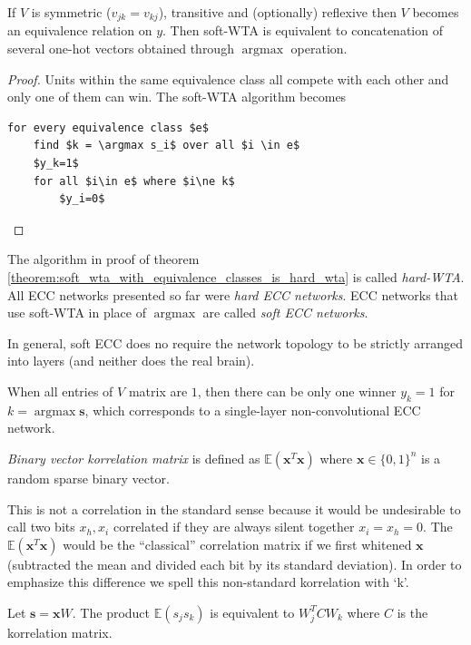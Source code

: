 \documentclass[oneside,english,logo]{amuthesis}
\DeclareMathOperator*{\argmax}{argmax}
\begin{document}
\begin{theorem}
	\label{theorem:soft_wta_with_equivalence_classes_is_hard_wta}
If $V$ is  symmetric ($v_{jk}=v_{kj}$), transitive and (optionally) reflexive then $V$ becomes an equivalence relation on $y$. Then soft-WTA is equivalent to concatenation of several one-hot vectors obtained through $\argmax$ operation.
\end{theorem}
\begin{proof}
	 Units within the same equivalence class all compete with each other and only one of them can win. The soft-WTA algorithm becomes
\begin{lstlisting}
for every equivalence class $e$
    find $k = \argmax s_i$ over all $i \in e$
    $y_k=1$ 
    for all $i\in e$ where $i\ne k$
        $y_i=0$ 
\end{lstlisting}
\end{proof}
\begin{definition}
The algorithm in proof of theorem \ref{theorem:soft_wta_with_equivalence_classes_is_hard_wta} is called \textit{hard-WTA}. All ECC networks presented so far were \textit{hard ECC networks}.
ECC networks that use soft-WTA in place of $\argmax$ are called \textit{soft ECC networks}.
\end{definition}
In general, soft ECC does no require the network topology to be strictly arranged into layers (and neither does the real brain).
\begin{corollary}
When all entries of $V$ matrix are $1$, then there can be only one winner $y_k=1$ for $k=\argmax \boldsymbol{s}$, which corresponds to a single-layer non-convolutional ECC network. 
\end{corollary}
\begin{definition}
\textit{Binary vector korrelation matrix} is defined as $\mathbb{E}(\boldsymbol{x}^T\boldsymbol{x})$ where $\boldsymbol{x}\in \{0,1\}^n$ is a random sparse binary vector.
\end{definition}
This is not a correlation in the standard sense because it would be undesirable to call two bits $x_h,x_i$ correlated  if they are always silent together $x_i=x_h=0$. The $\mathbb{E}(\boldsymbol{x}^T\boldsymbol{x})$ would be the ``classical'' correlation matrix if we first whitened $\boldsymbol{x}$ (subtracted the mean and divided each bit by its standard deviation). In order to emphasize this difference we spell this non-standard korrelation with `k'.
\begin{theorem}
	\label{subsection:s_j_s_k_is_cos_sim}
Let $\boldsymbol{s}=\boldsymbol{x} W$. The product $\mathbb{E}(s_j s_k)$ is equivalent to $W_j^T C W_k$ where $C$ is the korrelation matrix.
\end{theorem}
\end{document}
